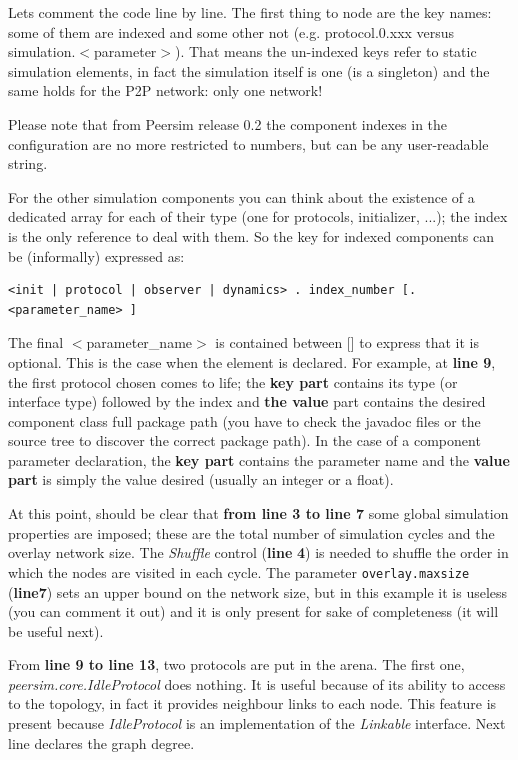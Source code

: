 \documentclass[a4paper,11pt]{article}
\begin{document}
Lets comment the code line by line. The first thing to node are the
key names: some of them are indexed and some other not (e.g. protocol.0.xxx
versus simulation.$<$parameter$>$). That means the un-indexed keys refer
to static simulation elements, in fact the simulation itself is one
(is a singleton) and the same holds for the P2P network: only one network!

Please note that from Peersim release 0.2 the component indexes in the
configuration are no more restricted to numbers, but can be any
user-readable string.

For the other simulation components you can think about the existence
of a dedicated array for each of their type (one for protocols, initializer,
...); the \textsf{index} is the only reference to deal with them.
So the key for indexed components can be (informally) expressed as:

\footnotesize
\begin{verbatim}
<init | protocol | observer | dynamics> . index_number [. <parameter_name> ]
\end{verbatim}
\normalsize


The final $<$parameter\_name$>$ is contained between {[}{]} to express
that it is optional. This is the case when the element is declared.
For example, at \textbf{line 9}, the first protocol chosen comes to life;
the \textbf{key part} contains its type (or interface type) followed
by the index and \textbf{the
value} part contains the desired component class full package path
(you have to check the javadoc files or the source tree to discover
the correct package path). In the case of a component parameter declaration,
the \textbf{key part} contains the parameter name and the \textbf{value
part} is simply the value desired (usually an integer or a float).

At this point, should be clear that \textbf{from line 3 to line 7}
some global simulation properties are imposed; these are the total
number of simulation cycles and the overlay network size. The
\emph{Shuffle} control (\textbf{line} \textbf{4})
is needed to shuffle the order in which the nodes are visited in each
cycle. The parameter \texttt{overlay.maxsize} 
(\textbf{line7}) sets an upper bound on the network size, but in this
example it is useless (you can comment it out) and it is only present
for sake of completeness (it will be useful next). 

From \textbf{line 9 to line 13}, two protocols are put in the arena.
The first one, \emph{peersim.core.IdleProtocol} does nothing. It is useful
because of its ability to access to the topology, in fact it provides
neighbour links to each node. This feature is present because \emph{IdleProtocol}
is an implementation of the \emph{Linkable} interface. Next line declares
the graph degree. 
\end{document}
